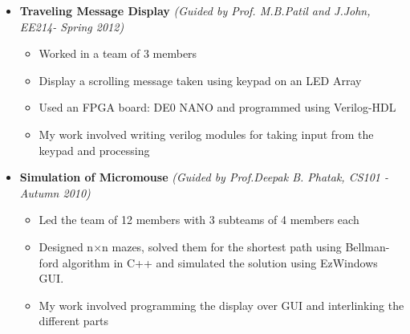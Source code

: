 \documentclass[a4paper,11pt]{article}
\newcommand{\isep}{-2 pt}
\begin{document}
\begin{itemize}
    \item \textbf{Traveling Message Display} \hfill \emph{(Guided by Prof. M.B.Patil and J.John, EE214- Spring 2012)}\\[-0.6cm]
    \begin{itemize}\itemsep \isep
        \item Worked in a team of 3 members
        \item Display a scrolling message taken using keypad on an LED Array
        \item Used an FPGA board: DE0 NANO and programmed using Verilog-HDL
        \item My work involved writing verilog modules for taking input from the keypad and processing
    \end{itemize}
        \item \textbf{Simulation of Micromouse} \hfill \emph{(Guided by Prof.Deepak B. Phatak, CS101 - Autumn 2010)}\\[-0.6cm]
    \begin{itemize}\itemsep \isep 
        \item Led the team of 12 members with 3 subteams of 4 members each
        \item Designed n$\times$n mazes, solved them for the shortest path using Bellman-ford algorithm in C++ and simulated the solution using EzWindows GUI.
        \item My work involved programming the display over GUI and interlinking the different parts
    \end{itemize}
\begin{comment}
\item \textbf{Term paper on Working of a Cordless Telephone} \emph{(Guided by Prof. Vasi J. , EE112 - Spring 2011)\\[-0.6cm]}
    \begin{itemize} \itemsep \isep
      \item Opened and Analyzed a Cordless phone.
      \item Worked in a team of 3 members.
      \item Written a 12-page Term paper with details of working of the phone.
    \end{itemize}
\end{comment}
\end{itemize}
\end{document}
